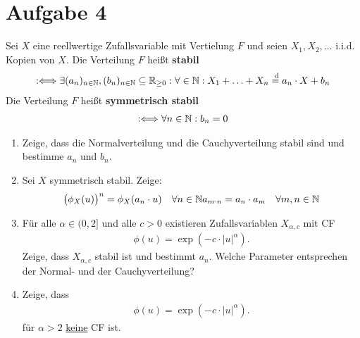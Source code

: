 \documentclass[12pt,a4paper]{article}
\begin{document}
\section*{Aufgabe 4}
Sei $X$ eine reellwertige Zufallsvariable mit Vertielung $F$ und seien $X_1,X_2,\ldots$ i.i.d. Kopien von $X$.
Die Verteilung $F$ heißt \textbf{stabil}
\begin{align*}
	:\Longleftrightarrow
	\exists(a_n)_{n\in\mathbb{N}},(b_n)_{n\in\mathbb{N}}\subseteq\mathbb{R}_{\geq0}:\forall\in\mathbb{N}:
	X_1+\ldots+X_n\overset{\text{ d}}{=}a_n\cdot X+b_n
\end{align*}
Die Verteilung $F$ heißt \textbf{symmetrisch stabil}
\begin{align*}
	:\Longleftrightarrow
	\forall n\in\mathbb{N}:b_n=0
\end{align*}

\begin{enumerate}[label=\alph*)]
	\item Zeige, dass die Normalverteilung und die Cauchyverteilung stabil sind und bestimme $a_n$ und $b_n$.
	\item Sei $X$ symmetrisch stabil.
	Zeige:
	\begin{align*}
		\big(\phi_X(u)\big)^n&=\phi_X(a_n\cdot u) & \forall n\in\mathbb{N}
		a_{m\cdot n}&=a_n\cdot a_m &\forall m,n\in\mathbb{N}
	\end{align*}		
	\item Für alle $\alpha\in(0,2]$ und alle $c>0$ existieren Zufallsvariablen $X_{\alpha,c}$ mit CF 
	\begin{align*}
		\phi(u)=\exp\left(-c\cdot|u|^\alpha\right).
	\end{align*}
	Zeige, dass $X_{\alpha,c}$ stabil ist und bestimmt $a_n$.
	Welche Parameter entsprechen der Normal- und der Cauchyverteilung?
	\item Zeige, dass
	\begin{align*}
		\phi(u)=\exp\left(-c\cdot|u|^\alpha\right).
	\end{align*}
	für $\alpha>2$ \ul{keine} CF ist.
\end{enumerate}
\end{document}
